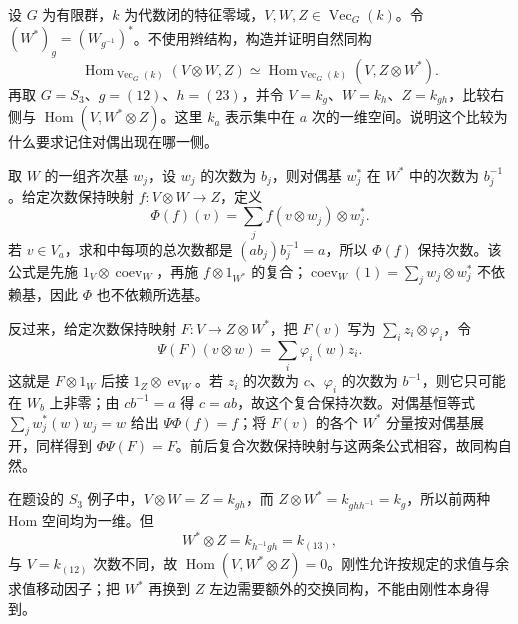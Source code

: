 \begin{exercise}\label{b5:ex:B:13}
	设 \(G\) 为有限群，\(k\) 为代数闭的特征零域，\(V,W,Z\in\operatorname{Vec}_G(k)\)。令 \((W^*)_g=(W_{g^{-1}})^*\)。不使用辫结构，构造并证明自然同构
	\[
		\operatorname{Hom}_{\operatorname{Vec}_G(k)}(V\otimes W,Z)
		\simeq
		\operatorname{Hom}_{\operatorname{Vec}_G(k)}(V,Z\otimes W^*).
	\]
	再取 \(G=S_3\)、\(g=(12)\)、\(h=(23)\)，并令 \(V=k_g\)、\(W=k_h\)、\(Z=k_{gh}\)，比较右侧与 \(\operatorname{Hom}(V,W^*\otimes Z)\)。这里 \(k_a\) 表示集中在 \(a\) 次的一维空间。说明这个比较为什么要求记住对偶出现在哪一侧。
\end{exercise}
\begin{solution}
	取 \(W\) 的一组齐次基 \(w_j\)，设 \(w_j\) 的次数为 \(b_j\)，则对偶基 \(w_j^*\) 在 \(W^*\) 中的次数为 \(b_j^{-1}\)。给定次数保持映射 \(f:V\otimes W\to Z\)，定义
	\[
		\Phi(f)(v)=\sum_j f(v\otimes w_j)\otimes w_j^*.
	\]
	若 \(v\in V_a\)，求和中每项的总次数都是 \((ab_j)b_j^{-1}=a\)，所以 \(\Phi(f)\) 保持次数。该公式是先施 \(1_V\otimes\operatorname{coev}_W\)，再施 \(f\otimes1_{W^*}\) 的复合；\(\operatorname{coev}_W(1)=\sum_jw_j\otimes w_j^*\) 不依赖基，因此 \(\Phi\) 也不依赖所选基。

	反过来，给定次数保持映射 \(F:V\to Z\otimes W^*\)，把 \(F(v)\) 写为 \(\sum_i z_i\otimes\varphi_i\)，令
	\[
		\Psi(F)(v\otimes w)=\sum_i\varphi_i(w)z_i.
	\]
	这就是 \(F\otimes1_W\) 后接 \(1_Z\otimes\operatorname{ev}_W\)。若 \(z_i\) 的次数为 \(c\)、\(\varphi_i\) 的次数为 \(b^{-1}\)，则它只可能在 \(W_b\) 上非零；由 \(cb^{-1}=a\) 得 \(c=ab\)，故这个复合保持次数。对偶基恒等式 \(\sum_jw_j^*(w)w_j=w\) 给出 \(\Psi\Phi(f)=f\)；将 \(F(v)\) 的各个 \(W^*\) 分量按对偶基展开，同样得到 \(\Phi\Psi(F)=F\)。前后复合次数保持映射与这两条公式相容，故同构自然。

	在题设的 \(S_3\) 例子中，\(V\otimes W=Z=k_{gh}\)，而 \(Z\otimes W^*=k_{ghh^{-1}}=k_g\)，所以前两种 Hom 空间均为一维。但
	\[
		W^*\otimes Z=k_{h^{-1}gh}=k_{(13)},
	\]
	与 \(V=k_{(12)}\) 次数不同，故 \(\operatorname{Hom}(V,W^*\otimes Z)=0\)。刚性允许按规定的求值与余求值移动因子；把 \(W^*\) 再换到 \(Z\) 左边需要额外的交换同构，不能由刚性本身得到。
\end{solution}

